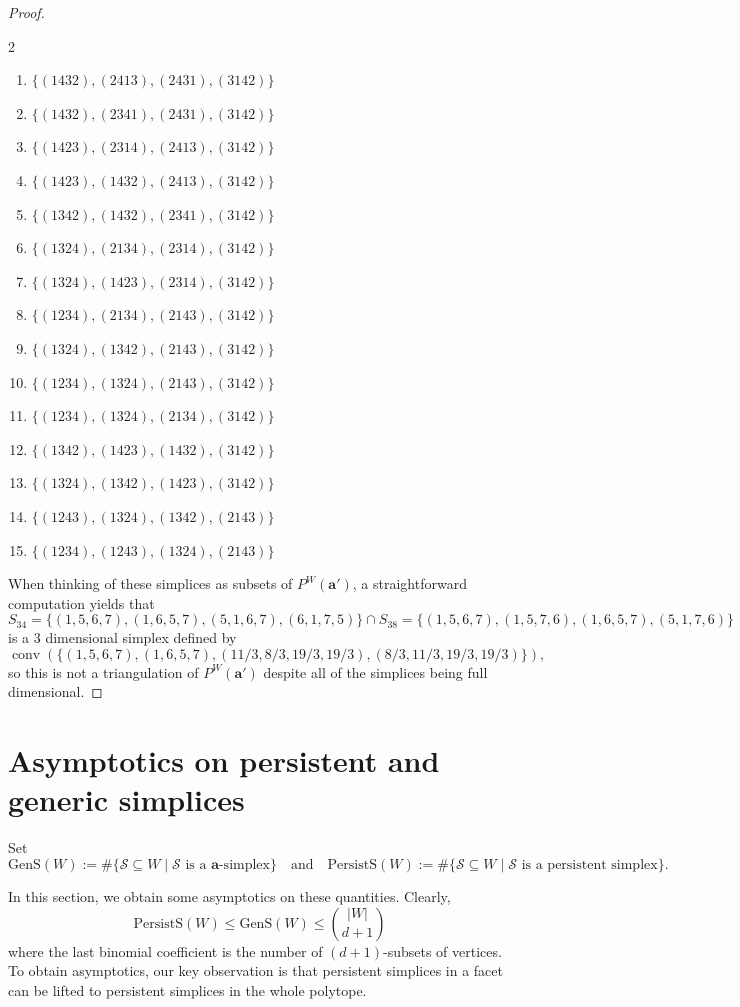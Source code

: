 \documentclass{amsart}
\theoremstyle{definition}
\def\ba{\mathbf{a}}
\def\wperm_#1{P^W(#1)}
\def\cS{\mathcal{S}}
\DeclareMathOperator{\conv}{conv}
\def\gsimp{\mathrm{GenS}}
\def\psimp{\mathrm{PersistS}}
\begin{document}
\begin{proof}
\begin{multicols}{2}
\begin{enumerate}[label=$S_{\arabic*}$, itemsep=1pt]
    \item $\{(1432), (2413), (2431), (3142)\}$
    \item $\{(1432), (2341), (2431), (3142)\}$
    \item $\{(1423), (2314), (2413), (3142)\}$
    \item $\{(1423), (1432), (2413), (3142)\}$
    \item $\{(1342), (1432), (2341), (3142)\}$
    \item $\{(1324), (2134), (2314), (3142)\}$
    \item $\{(1324), (1423), (2314), (3142)\}$
    \item $\{(1234), (2134), (2143), (3142)\}$
    \item $\{(1324), (1342), (2143), (3142)\}$
    \item $\{(1234), (1324), (2143), (3142)\}$
    \item $\{(1234), (1324), (2134), (3142)\}$
    \item $\{(1342), (1423), (1432), (3142)\}$
    \item $\{(1324), (1342), (1423), (3142)\}$
    \item $\{(1243), (1324), (1342), (2143)\}$
    \item $\{(1234), (1243), (1324), (2143)\}$
\end{enumerate}
\end{multicols}
    When thinking of these simplices as subsets of $\wperm_{\ba'}$, a straightforward computation yields that $$S_{34}=\{(1,5,6,7),(1,6,5,7),(5,1,6,7),(6,1,7,5)\}\cap S_{38}=\{(1,5,6,7),(1,5,7,6),(1,6,5,7),(5,1,7,6)\}$$ is a $3$ dimensional simplex defined by \[\conv(\{(1,5,6,7),(1,6,5,7),(11/3,8/3,19/3,19/3),(8/3,11/3,19/3,19/3)\}),\] so this is not a triangulation of $\wperm_{\ba'}$ despite all of the simplices being full dimensional.
\end{proof}



\section{Asymptotics on persistent and generic simplices}\label{sec:asymptotics}

Set
\[\gsimp(W):=\#\{\cS\subseteq W\mid \cS \text{ is a }\ba\text{-simplex}\} \quad \text{and} \quad \psimp(W):=\#\{\cS\subseteq W\mid \cS \text{ is a persistent simplex}\}.\]

In this section, we obtain some asymptotics on these quantities.
Clearly,
\[
\psimp(W)
\le
\gsimp(W)
\le
\binom{|W|}{d+1}
\]
where the last binomial coefficient is the number of 
\((d+1)\)-subsets of vertices.
 To obtain asymptotics, our key observation is that persistent simplices in a facet can be lifted to
persistent simplices in the whole polytope.
\end{document}
